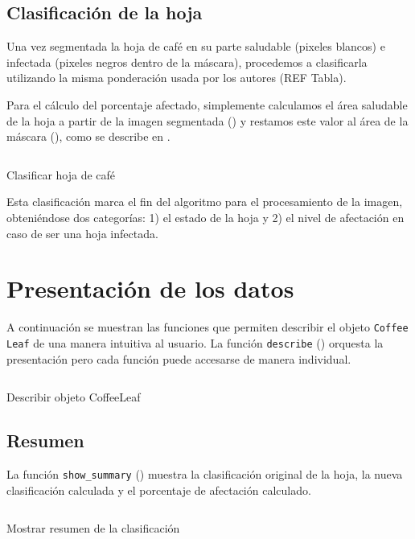 \subsection{Clasificación de la hoja}
Una vez segmentada la hoja de café en su parte saludable (pixeles blancos) e infectada (pixeles negros dentro de la máscara), procedemos a clasificarla utilizando la misma ponderación usada por los autores (REF Tabla).

Para el cálculo del porcentaje afectado, simplemente calculamos el área saludable de la hoja a partir de la imagen segmentada () y restamos este valor al área de la máscara (), como se describe en .

\begin{listing}[!ht]
\inputminted{python}{code_listings/categorize.py}
\caption{Clasificar hoja de café}
\label{code:categorize}
\end{listing}

Esta clasificación marca el fin del algoritmo para el procesamiento de la imagen, obteniéndose dos categorías: 1) el estado de la hoja y 2) el nivel de afectación en caso de ser una hoja infectada.

\section{Presentación de los datos}
A continuación se muestran las funciones que permiten describir el objeto \texttt{Coffee Leaf} de una manera intuitiva al usuario. La función \texttt{describe} () orquesta la presentación pero cada función puede accesarse de manera individual.

\begin{listing}[!ht]
\inputminted{python}{code_listings/describe.py}
\caption{Describir objeto CoffeeLeaf}
\label{code:describe}
\end{listing}

\subsection{Resumen}
La función \texttt{show\_summary} () muestra la clasificación original de la hoja, la nueva clasificación calculada y el porcentaje de afectación calculado.

\begin{listing}[!ht]
\inputminted{python}{code_listings/show_summary.py}
\caption{Mostrar resumen de la clasificación}
\label{code:show_summary}
\end{listing}

